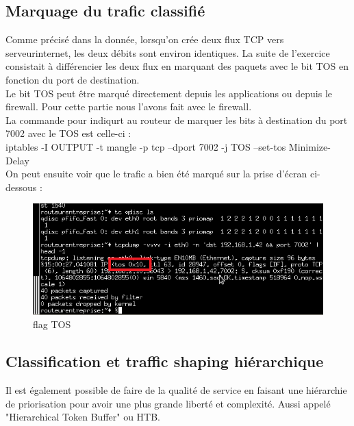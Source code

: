 \documentclass{article}
\begin{document}
\subsection{Marquage du trafic classifié}

Comme précisé dans la donnée, lorsqu'on crée deux flux TCP vers serveurinternet, les deux débits sont environ identiques. La suite de l'exercice consistait à différencier les deux flux en marquant des paquets avec le bit TOS en fonction du port de destination.\\

Le bit TOS peut être marqué directement depuis les applications ou depuis le firewall. Pour cette partie nous l'avons fait avec le firewall.\\

La commande pour indiqurt au routeur de marquer les bits à destination du port 7002 avec le TOS est celle-ci :\\

iptables -I OUTPUT -t mangle -p tcp --dport 7002 -j TOS --set-tos Minimize-Delay\\

On peut ensuite voir que le trafic a bien été marqué sur la prise d'écran ci-dessous : 

\begin{figure}[h]
  \centering
  \includegraphics[width=\linewidth]{./captures/tos-Flag.png}
  \caption{flag TOS}
  \label{fig:token-bucket}
\end{figure}


\subsection{Classification et traffic shaping hiérarchique}

Il est également possible de faire de la qualité de service en faisant une hiérarchie de priorisation pour avoir une plus grande liberté et complexité. Aussi appelé "Hierarchical Token Buffer" ou HTB. \\
\end{document}
